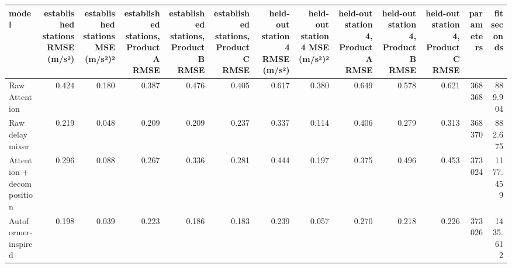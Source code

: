 \begin{tabular}{lrrrrrrrrrrrr}
\toprule
model & established stations RMSE (m/s²) & established stations MSE (m/s²)² & established stations, Product A RMSE & established stations, Product B RMSE & established stations, Product C RMSE & held-out station 4 RMSE (m/s²) & held-out station 4 MSE (m/s²)² & held-out station 4, Product A RMSE & held-out station 4, Product B RMSE & held-out station 4, Product C RMSE & parameters & fit seconds \\
\midrule
Raw Attention & 0.424 & 0.180 & 0.387 & 0.476 & 0.405 & 0.617 & 0.380 & 0.649 & 0.578 & 0.621 & 368368 & 889.904 \\
Raw delay mixer & 0.219 & 0.048 & 0.209 & 0.209 & 0.237 & 0.337 & 0.114 & 0.406 & 0.279 & 0.313 & 368370 & 882.675 \\
Attention + decomposition & 0.296 & 0.088 & 0.267 & 0.336 & 0.281 & 0.444 & 0.197 & 0.375 & 0.496 & 0.453 & 373024 & 1177.459 \\
Autoformer-inspired & 0.198 & 0.039 & 0.223 & 0.186 & 0.183 & 0.239 & 0.057 & 0.270 & 0.218 & 0.226 & 373026 & 1435.612 \\
\bottomrule
\end{tabular}
